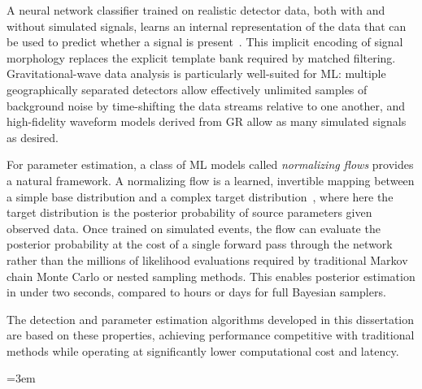 \begin{refsection}
A neural network classifier trained on realistic detector data, both with and without simulated signals, learns an internal representation of the data that can be used to predict whether a signal is present~\cite{PhysRevLett.120.141103}.
This implicit encoding of signal morphology replaces the explicit template bank required by matched filtering.
Gravitational-wave data analysis is particularly well-suited for ML: multiple geographically separated detectors allow effectively unlimited samples of background noise by time-shifting the data streams relative to one another, and high-fidelity waveform models derived from GR allow as many simulated signals as desired.

For parameter estimation, a class of ML models called \emph{normalizing flows} provides a natural framework.
A normalizing flow is a learned, invertible mapping between a simple base distribution and a complex target distribution~\cite{papamakarios2021normalizing}, where here the target distribution is the posterior probability of source parameters given observed data.
Once trained on simulated events, the flow can evaluate the posterior probability at the cost of a single forward pass through the network rather than the millions of likelihood evaluations required by traditional Markov chain Monte Carlo or nested sampling methods.
This enables posterior estimation in under two seconds, compared to hours or days for full Bayesian samplers.

The detection and parameter estimation algorithms developed in this dissertation are based on these properties, achieving performance competitive with traditional methods while operating at significantly lower computational cost and latency.


\singlespacing
\begingroup
\emergencystretch=3em
\printbibliography[title=References,heading=subbibintoc]
\endgroup
\end{refsection}